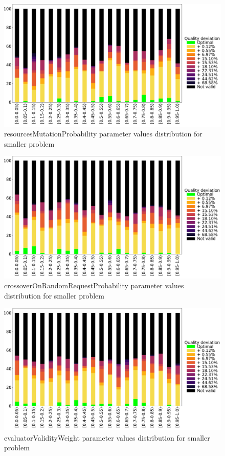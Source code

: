 \begin{figure}
	\centering
	\includegraphics[width=\textwidth]{images/DistrObj/resourcesMutationProbability.pdf}
	\caption[]{resourcesMutationProbability parameter values distribution for smaller problem}
	\label{fig:resourcesMutationProbability_Obj}
\end{figure}

\begin{figure}
	\centering
	\includegraphics[width=\textwidth]{images/DistrObj/crossoverOnRandomRequestProbability.pdf}
	\caption[]{crossoverOnRandomRequestProbability parameter values distribution for smaller problem}       
	\label{fig:crossoverOnRandomRequestProbability_Obj}
\end{figure}


\begin{figure}
	\centering
	\includegraphics[width=\textwidth]{images/DistrObj/evaluatorValidityWeight.pdf}
	\caption[]{evaluatorValidityWeight parameter values distribution for smaller problem}
	\label{fig:evaluatorValidityWeight_Obj}
\end{figure}

